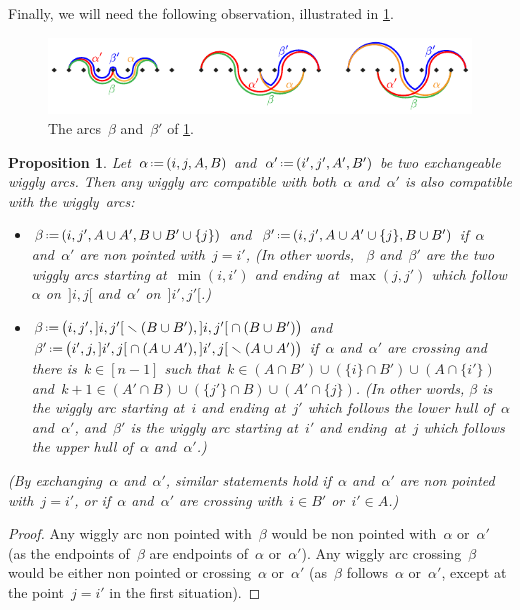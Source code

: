 \documentclass{amsart}
\newtheorem{proposition}[theorem]{Proposition}
\theoremstyle{definition}
\newcommand{\ssm}{\smallsetminus} %
\newcommand{\eqdef}{\mbox{\,\raisebox{0.2ex}{\scriptsize\ensuremath{\mathrm:}}\ensuremath{=}\,}} %
\begin{document}
Finally, we will need the following observation, illustrated in \cref{fig:incompatible3}.
%
\begin{figure}
\centerline{\includegraphics[scale=1.3]{incompatible3}}
\caption{The arcs~$\beta$ and~$\beta'$ of \cref{prop:uerp}.}
\label{fig:incompatible3}
\end{figure}

\begin{proposition}
\label{prop:uerp}
Let~$\alpha \eqdef (i, j, A, B)$ and~$\alpha' \eqdef (i', j', A', B')$ be two exchangeable wiggly arcs.
Then any wiggly arc compatible with both~$\alpha$ and~$\alpha'$ is also compatible with the wiggly~arcs:
\begin{itemize}
\item $\beta \eqdef (i, j', A \cup A', B \cup B' \cup \{j\})$ and~$\beta' \eqdef (i, j', A \cup A' \cup \{j\}, B \cup B')$ if~$\alpha$ and~$\alpha'$ are non pointed with~$j = i'$,
(In other words, ~$\beta$ and~$\beta'$ are the two wiggly arcs starting at~$\min(i,i')$ and ending at~$\max(j,j')$ which follow $\alpha$ on~$]i,j[$ and~$\alpha'$ on~$]i',j'[$.)
\item $\beta \eqdef \big( i, j', {]i,j'[} \ssm (B \cup B'), {]i,j'[} \cap (B \cup B') \big)$ and~$\beta' \eqdef \big( i', j, {]i',j[} \cap (A \cup A'), {]i',j[} \ssm (A \cup A') \big)$ if~$\alpha$ and~$\alpha'$ are crossing and there is~$k \in [n-1]$ such that~$k \in (A \cap B') \cup (\{i\} \cap B') \cup (A \cap \{i'\})$ and~$k+1 \in (A' \cap B) \cup (\{j'\} \cap B) \cup (A' \cap \{j\})$.
(In other words, $\beta$ is the wiggly arc starting at~$i$ and ending at~$j'$ which follows the lower hull of~$\alpha$ and~$\alpha'$, and~$\beta'$ is the wiggly arc starting at~$i'$ and ending~at~$j$ which follows the upper hull of~$\alpha$ and~$\alpha'$.)
\end{itemize}
(By exchanging~$\alpha$ and~$\alpha'$, similar statements hold if~$\alpha$ and~$\alpha'$ are non pointed with~$j = i'$, or if~$\alpha$ and~$\alpha'$ are crossing with~$i \in B'$ or~$i' \in A$.)
\end{proposition}

\begin{proof}
Any wiggly arc non pointed with~$\beta$ would be non pointed with~$\alpha$ or~$\alpha'$ (as the endpoints of~$\beta$ are endpoints of~$\alpha$ or~$\alpha'$).
Any wiggly arc crossing~$\beta$ would be either non pointed or crossing~$\alpha$ or~$\alpha'$ (as~$\beta$ follows~$\alpha$ or~$\alpha'$, except at the point~$j = i'$ in the first situation).
\end{proof}
\end{document}
